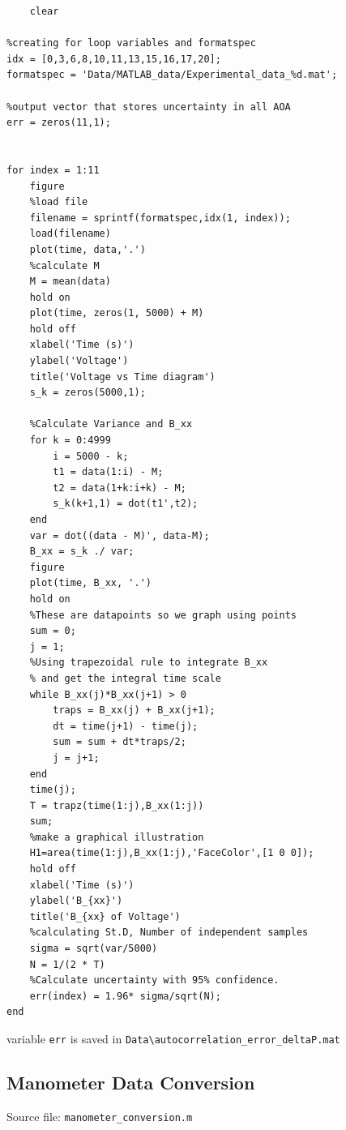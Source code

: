 \documentclass[runningheads]{llncs}
\begin{document}
\begin{verbatim}
    clear

%creating for loop variables and formatspec
idx = [0,3,6,8,10,11,13,15,16,17,20];
formatspec = 'Data/MATLAB_data/Experimental_data_%d.mat';

%output vector that stores uncertainty in all AOA
err = zeros(11,1);


for index = 1:11
    figure
    %load file
    filename = sprintf(formatspec,idx(1, index));
    load(filename)
    plot(time, data,'.')
    %calculate M
    M = mean(data)
    hold on
    plot(time, zeros(1, 5000) + M)
    hold off
    xlabel('Time (s)')
    ylabel('Voltage')
    title('Voltage vs Time diagram')
    s_k = zeros(5000,1);
    
    %Calculate Variance and B_xx
    for k = 0:4999 
        i = 5000 - k;
        t1 = data(1:i) - M;
        t2 = data(1+k:i+k) - M;
        s_k(k+1,1) = dot(t1',t2);    
    end
    var = dot((data - M)', data-M);
    B_xx = s_k ./ var;
    figure
    plot(time, B_xx, '.')
    hold on 
    %These are datapoints so we graph using points
    sum = 0;
    j = 1;
    %Using trapezoidal rule to integrate B_xx 
    % and get the integral time scale
    while B_xx(j)*B_xx(j+1) > 0
        traps = B_xx(j) + B_xx(j+1);
        dt = time(j+1) - time(j);
        sum = sum + dt*traps/2;
        j = j+1;
    end
    time(j);
    T = trapz(time(1:j),B_xx(1:j))
    sum;
    %make a graphical illustration
    H1=area(time(1:j),B_xx(1:j),'FaceColor',[1 0 0]);
    hold off
    xlabel('Time (s)')
    ylabel('B_{xx}')
    title('B_{xx} of Voltage')
    %calculating St.D, Number of independent samples 
    sigma = sqrt(var/5000)
    N = 1/(2 * T)
    %Calculate uncertainty with 95% confidence. 
    err(index) = 1.96* sigma/sqrt(N);
end
\end{verbatim}

variable \verb|err| is saved in 
\verb|Data\autocorrelation_error_deltaP.mat|

\subsection{Manometer Data Conversion}

Source file: \verb|manometer_conversion.m|
\end{document}
